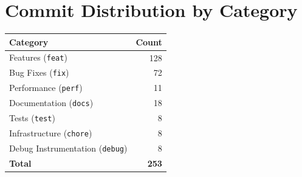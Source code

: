 \documentclass[12pt,a4paper]{article}
\begin{document}
\section{Commit Distribution by Category}

\begin{center}
\begin{tabular}{@{}lr@{}}
\toprule
\textbf{Category} & \textbf{Count} \\
\midrule
Features (\texttt{feat}) & 128 \\
Bug Fixes (\texttt{fix}) & 72 \\
Performance (\texttt{perf}) & 11 \\
Documentation (\texttt{docs}) & 18 \\
Tests (\texttt{test}) & 8 \\
Infrastructure (\texttt{chore}) & 8 \\
Debug Instrumentation (\texttt{debug}) & 8 \\
\midrule
\textbf{Total} & \textbf{253} \\
\bottomrule
\end{tabular}
\end{center}
\end{document}
